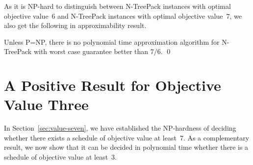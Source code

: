 \documentclass[runningheads]{llncs}
\newcommand{\xxxNTP}{{\sc N-TreePack}}
\begin{document}
As it is NP-hard to distinguish between {\xxxNTP} instances with optimal objective value~$6$ 
and {\xxxNTP} instances with optimal objective value~$7$, we also get the following 
in approximability result.
\begin{corollary}
\label{coro:inapproximability}
Unless P=NP, there is no polynomial time approximation algorithm for {\xxxNTP} with
worst case guarantee better than $7/6$.
\qed
\end{corollary}


\section{A Positive Result for Objective Value Three}
\label{sec:value-three}
In Section~\ref{sec:value-seven}, we have established the NP-hardness of deciding whether 
there exists a schedule of objective value at least~$7$. 
As a complementary result, we now show that it can be decided in polynomial time whether there is
a schedule of objective value at least~$3$.
\end{document}
